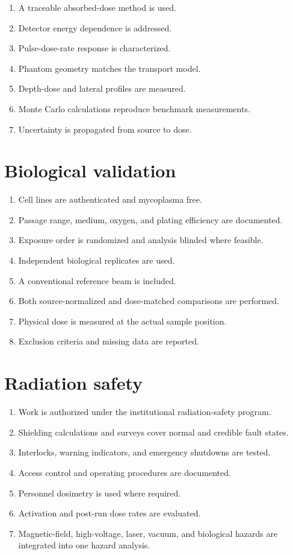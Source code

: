 \begin{enumerate}[label=$\square$]
\item A traceable absorbed-dose method is used.
\item Detector energy dependence is addressed.
\item Pulse-dose-rate response is characterized.
\item Phantom geometry matches the transport model.
\item Depth-dose and lateral profiles are measured.
\item Monte Carlo calculations reproduce benchmark measurements.
\item Uncertainty is propagated from source to dose.
\end{enumerate}

\section{Biological validation}

\begin{enumerate}[label=$\square$]
\item Cell lines are authenticated and mycoplasma free.
\item Passage range, medium, oxygen, and plating efficiency are documented.
\item Exposure order is randomized and analysis blinded where feasible.
\item Independent biological replicates are used.
\item A conventional reference beam is included.
\item Both source-normalized and dose-matched comparisons are performed.
\item Physical dose is measured at the actual sample position.
\item Exclusion criteria and missing data are reported.
\end{enumerate}

\section{Radiation safety}

\begin{enumerate}[label=$\square$]
\item Work is authorized under the institutional radiation-safety program.
\item Shielding calculations and surveys cover normal and credible fault states.
\item Interlocks, warning indicators, and emergency shutdowns are tested.
\item Access control and operating procedures are documented.
\item Personnel dosimetry is used where required.
\item Activation and post-run dose rates are evaluated.
\item Magnetic-field, high-voltage, laser, vacuum, and biological hazards are integrated into one hazard analysis.
\end{enumerate}

